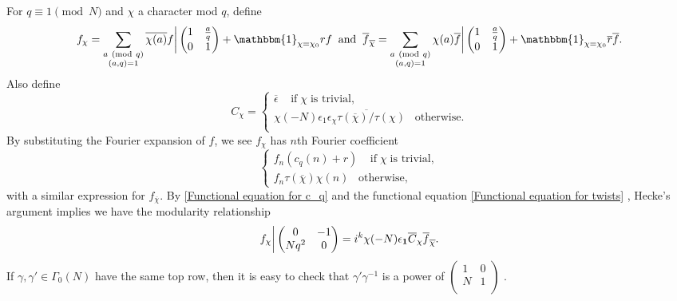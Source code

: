 \documentclass[a4paper,12.5pt]{amsart}
\theoremstyle{definition}
\theoremstyle{remark}
\newcommand{\Mod}[1]{\ (\mathrm{mod}\ #1)}
\begin{document}
For $q \equiv 1 \pmod{N}$ and $\chi$ a character mod $q$, define 
\[  f_{\chi} =  \sum_{ \substack{ a \Mod{q}  \\ (a,q)=1       } } \overline{\chi(a)} 
 f \bigg |  \begin{pmatrix}
 1 & \frac{a}{q} \\
0 & 1    
\end{pmatrix} + \mathbbm{1} _{ \chi=\chi_0} rf    \; \; \text{and}  \; \; \overline{f}_{\overline{\chi}} = \sum_{ \substack{ a \Mod{q}  \\ (a,q)=1       } } \chi(a) 
\overline{ f} \bigg |  \begin{pmatrix}
 1 & \frac{a}{q} \\
0 & 1    
                \end{pmatrix}  + \mathbbm{1}_{\chi=\chi_0} \overline{r} \overline{f}.       \]
Also define
 \[  C_{\chi} = \begin{cases}
 \overline{\epsilon}    \; \; \; \; \text{if} \;   \chi   \; \text{is trivial},\\ 
\chi(-N) \epsilon_1 \overline{  \epsilon_{\chi} \tau(\overline{ \chi})/\tau(\chi)    } \; \; \; \text{otherwise} .  \\

\end{cases}              \]
By substituting the Fourier expansion of $f$, we see $f_{\chi}$ has $n$th Fourier coefficient 
 \[        \begin{cases}    
 f_n( c_q(n)+r )  \; \; \; \; \text{if} \;   \chi   \; \text{is trivial},\\ 
  f_n \tau(\overline{\chi}) \chi(n) \; \; \; \text{otherwise},
 \end{cases}\]
 with a similar expression for $f_{\overline{\chi}}$.
  By  \eqref{Functional equation for c_q} and  the functional equation \eqref{Functional equation for twists} ,  Hecke's argument  implies we have the  modularity relationship
\begin{equation} {\label{Modular relationship for twists}}
 f _{\chi} \bigg| \begin{pmatrix}
 0 & -1 \\
Nq^2 & 0   
\end{pmatrix} = i^k \chi(-N) \epsilon_{\bold{1}}  \overline{C}_{\chi} \overline{f}_{ \overline{\chi}}. \end{equation} 
                If $\gamma, \gamma' \in \Gamma_0 (N)$ have the same top row, then it is easy to check that $ \gamma' \gamma ^{-1}$ is a power of $ \begin{pmatrix}
1 & 0 \\
N & 1 \\
\end{pmatrix}   $ .
\end{document}
